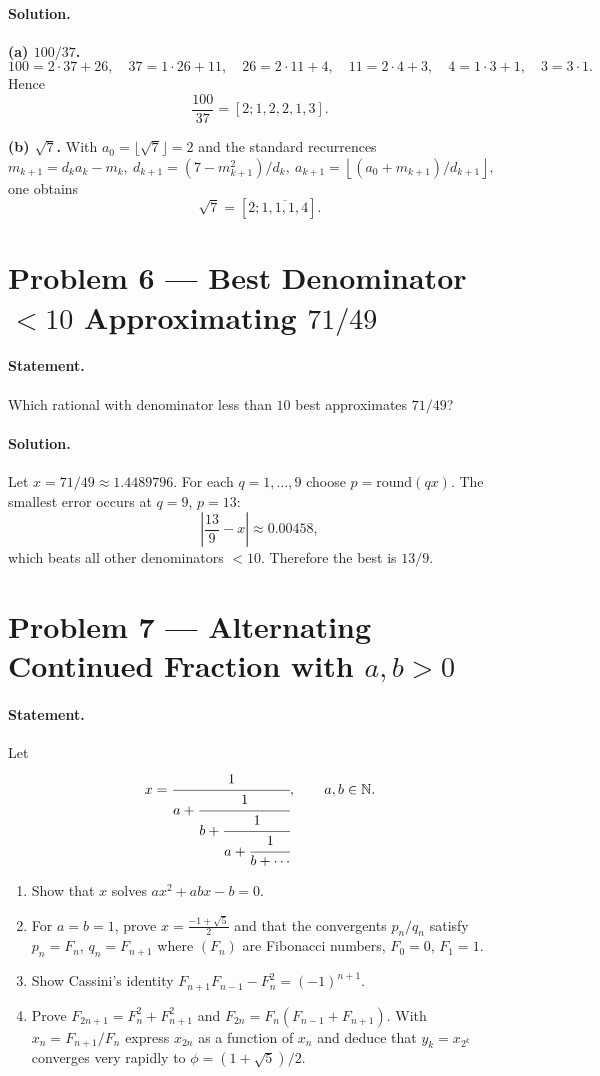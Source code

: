 \documentclass[12pt,a4paper]{article}
\theoremstyle{plain}
\theoremstyle{definition}
\theoremstyle{remark}
\theoremstyle{remark}
\begin{document}
\paragraph{Solution.}
\textbf{(a) $100/37$.}
\[
100=2\cdot 37+26,\quad
37=1\cdot 26+11,\quad
26=2\cdot 11+4,\quad
11=2\cdot 4+3,\quad
4=1\cdot 3+1,\quad
3=3\cdot 1.
\]
Hence
\[
\frac{100}{37}=[2;1,2,2,1,3].
\]

\noindent
\textbf{(b) $\sqrt7$.}
With $a_0=\lfloor\sqrt7\rfloor=2$ and the standard recurrences
\(
m_{k+1}=d_k a_k-m_k,\ 
d_{k+1}=(7-m_{k+1}^2)/d_k,\ 
a_{k+1}=\left\lfloor (a_0+m_{k+1})/d_{k+1}\right\rfloor,
\)
one obtains
\[
\sqrt7=[2;\overline{1,1,1,4}].
\]

\bigskip
\section*{Problem 6 — Best Denominator $<10$ Approximating $71/49$}

\paragraph{Statement.}
Which rational with denominator less than $10$ best approximates $71/49$?

\paragraph{Solution.}
Let $x=71/49\approx1.4489796$. For each $q=1,\dots,9$ choose $p=\mathrm{round}(qx)$.
The smallest error occurs at $q=9$, $p=13$:
\[
\left|\frac{13}{9}-x\right|\approx 0.00458,
\]
which beats all other denominators $<10$. Therefore the best is $\boxed{13/9}$.

\bigskip
\section*{Problem 7 — Alternating Continued Fraction with $a,b>0$}

\paragraph{Statement.}
Let
\[
x=\cfrac{1}{\displaystyle a+\cfrac{1}{\displaystyle b+\cfrac{1}{\displaystyle a+\cfrac{1}{\displaystyle b+\cdots}}}},
\qquad a,b\in\mathbb N.
\]
\begin{enumerate}[label=(\alph*), leftmargin=*]
	\item Show that $x$ solves $a x^2 + a b x - b=0$.
	\item For $a=b=1$, prove $x=\frac{-1+\sqrt5}{2}$ and that the convergents $p_n/q_n$ satisfy
	$p_n=F_n$, $q_n=F_{n+1}$ where $(F_n)$ are Fibonacci numbers, $F_0=0$, $F_1=1$.
	\item Show Cassini’s identity $F_{n+1}F_{n-1}-F_n^2=(-1)^{n+1}$.
	\item Prove $F_{2n+1}=F_n^2+F_{n+1}^2$ and $F_{2n}=F_n(F_{n-1}+F_{n+1})$.
	With $x_n=F_{n+1}/F_n$ express $x_{2n}$ as a function of $x_n$ and deduce that
	$y_k=x_{2^k}$ converges very rapidly to $\phi=(1+\sqrt5)/2$.
\end{enumerate}
\end{document}
